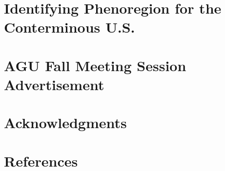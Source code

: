 \documentclass{beamer}
\begin{document}
\section[Phenoregions]{Identifying Phenoregion for the Conterminous U.S.}


%

%

\section[AGU Advert]{AGU Fall Meeting Session Advertisement}


\section{Acknowledgments}


\section{References}

\end{document}
